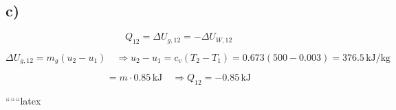 

\subsection*{c)}

\[
Q_{12} = \Delta U_{g,12} = -\Delta U_{W,12}
\]

\[
\Delta U_{g,12} = m_g (u_2 - u_1) \quad \Rightarrow u_2 - u_1 = c_v (T_2 - T_1) = 0.673 (500 - 0.003) = 376.5 \, \text{kJ/kg}
\]

\[
= m \cdot 0.85 \, \text{kJ} \quad \Rightarrow Q_{12} = -0.85 \, \text{kJ}
\]

``````latex